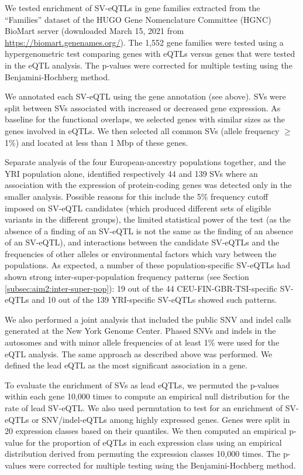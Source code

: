 \documentclass[11pt]{ucscthesis}
\begin{document}
We tested enrichment of SV-eQTLs in gene families extracted from the ``Families'' dataset of the HUGO Gene Nomenclature Committee (HGNC) BioMart server (downloaded March 15, 2021 from \url{https://biomart.genenames.org/}).
The 1,552 gene families were tested using a hypergenometric test comparing genes with eQTLs versus genes that were tested in the eQTL analysis.
The p-values were corrected for multiple testing using the Benjamini-Hochberg method.

We annotated each SV-eQTL using the gene annotation (see above).
SVs were split between SVs associated with increased or decreased gene expression.
As baseline for the functional overlaps, we selected genes with similar sizes as the genes involved in eQTLs.
We then selected all common SVs (allele frequency $\geq$ 1\%) and located at less than 1 Mbp of these genes.

Separate analysis of the four European-ancestry populations together, and the YRI population alone, identified respectively 44 and 139 SVs where an association with the expression of protein-coding genes was detected only in the smaller analysis.
Possible reasons for this include the 5\% frequency cutoff imposed on SV-eQTL candidates (which produced different sets of eligible variants in the different groups), the limited statistical power of the test (as the absence of a finding of an SV-eQTL is not the same as the finding of an absence of an SV-eQTL), and interactions between the candidate SV-eQTLs and the frequencies of other alleles or environmental factors which vary between the populations.
As expected, a number of these population-specific SV-eQTLs had shown strong inter-super-population frequency patterns (see Section \ref{subsec:aim2:inter-super-pop}):
19 out of the 44 CEU-FIN-GBR-TSI-specific SV-eQTLs and 10 out of the 139 YRI-specific SV-eQTLs showed such patterns.

We also performed a joint analysis that included the public SNV and indel calls generated at the New York Genome Center\cite{1000gp_nygc_2021}.
Phased SNVs and indels in the autosomes and with minor allele frequencies of at least 1\% were used for the eQTL analysis.
The same approach as described above was performed.
We defined the lead eQTL as the most significant association in a gene.

To evaluate the enrichment of SVs as lead eQTLs, we permuted the p-values within each gene 10,000 times to compute an empirical null distribution for the rate of lead SV-eQTL.
We also used permutation to test for an enrichment of SV-eQTLs or SNV/indel-eQTLs among highly expressed genes.
Genes were split in 20 expression classes based on their quantiles.
We then computed an empirical p-value for the proportion of eQTLs in each expression class using an empirical distribution derived from permuting the expression classes 10,000 times.
The p-values were corrected for multiple testing using the Benjamini-Hochberg method.
\end{document}
